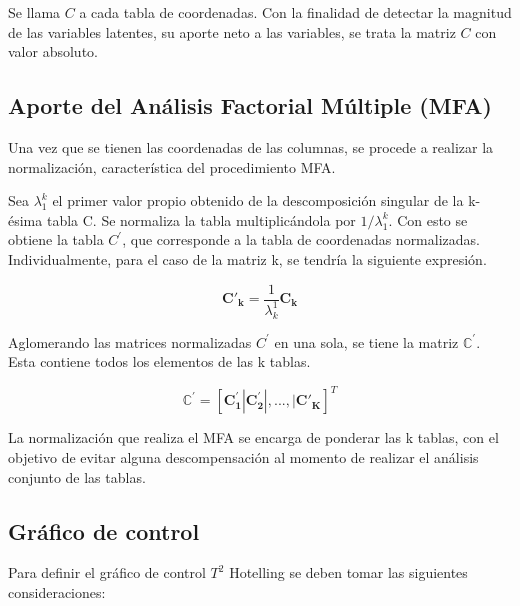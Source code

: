 \documentclass[water,article,submit,moreauthors,pdftex]{mdpi}
\begin{document}
Se llama \(C\) a cada tabla de coordenadas. Con la finalidad de detectar
la magnitud de las variables latentes, su aporte neto a las variables,
se trata la matriz \(C\) con valor absoluto.

\hypertarget{aporte-del-anuxe1lisis-factorial-muxfaltiple-mfa}{%
\subsection{Aporte del Análisis Factorial Múltiple
(MFA)}\label{aporte-del-anuxe1lisis-factorial-muxfaltiple-mfa}}

Una vez que se tienen las coordenadas de las columnas, se procede a
realizar la normalización, característica del procedimiento MFA.

Sea \(\lambda_{1}^{k}\) el primer valor propio obtenido de la
descomposición singular de la k-ésima tabla C. Se normaliza la tabla
multiplicándola por \(1/\lambda_{1}^{k}\). Con esto se obtiene la tabla
\(C^{'}\), que corresponde a la tabla de coordenadas normalizadas.\\
Individualmente, para el caso de la matriz k, se tendría la siguiente
expresión.

\begin{equation}
\mathbf{C'_k}=\frac{1}{\lambda_{k}^1} \mathbf{C_k}
\label{eq:Cprimak}
\end{equation}

Aglomerando las matrices normalizadas \(C^{'}\) en una sola, se tiene la
matriz \(\mathbb{C}^{'}\). Esta contiene todos los elementos de las k
tablas.

\begin{equation}
\mathbf{\mathbb{C^{'}}}=[\mathbf{C_1^{'}}|\mathbf{C_2^{'}}|,...,|\mathbf{C'_{K}}]^{T}
\label{eq:Cprima}
\end{equation}

La normalización que realiza el MFA se encarga de ponderar las k tablas,
con el objetivo de evitar alguna descompensación al momento de realizar
el análisis conjunto de las tablas.

\hypertarget{gruxe1fico-de-control}{%
\subsection{Gráfico de control}\label{gruxe1fico-de-control}}

Para definir el gráfico de control \(T^2\) Hotelling se deben tomar las
siguientes consideraciones:
\end{document}
